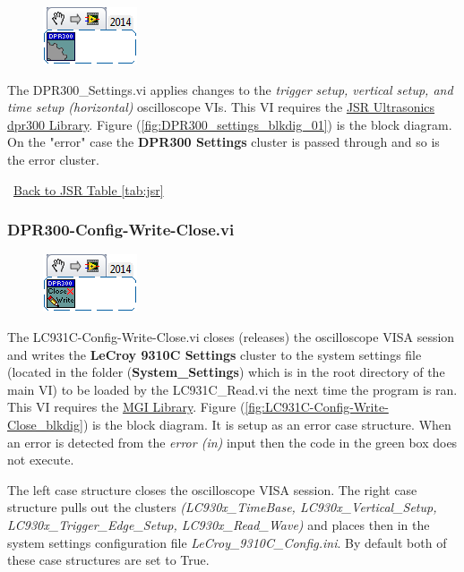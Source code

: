 \documentclass[11pt,a4paper,oldfontcommands]{memoir}
\begin{document}
\begin{figure}[h]
	\includegraphics[scale=0.625]{DPR300_settings_main_01}
	\label{fig:DPR300_settings_main_01}
\end{figure}

The DPR300\_Settings.vi applies changes to the \textit{trigger setup, vertical setup, and time setup (horizontal)} oscilloscope VIs. This VI requires the \href{http://sine.ni.com/apps/utf8/niid_web_display.model_page?p_model_id=5819}{JSR Ultrasonics dpr300 Library}. Figure (\ref{fig:DPR300_settings_blkdig_01}) is the block diagram. On the "error" case the \textbf{DPR300 Settings} cluster is passed through and so is the error cluster.

\noindent\hrulefill\, \hyperref[tab:jsr]{Back to JSR Table \ref{tab:jsr}}

\subsubsection{DPR300-Config-Write-Close.vi} \label{DPR300_cwc}
\noindent\hrulefill

\begin{figure}[h]
	\includegraphics[scale=0.625]{DPR300-Config-Write-Close_main_01}
	\label{fig:DPR300-Config-Write-Close_main_01}
\end{figure}

The LC931C-Config-Write-Close.vi closes (releases) the oscilloscope VISA session and writes the \textbf{LeCroy 9310C Settings} cluster to the system settings file (located in the folder (\textbf{System\_Settings}) which is in the root directory of the main VI) to be loaded by the LC931C\_Read.vi the next time the program is ran. This VI requires the \href{http://sine.ni.com/nips/cds/view/p/lang/en/nid/209753}{MGI Library}. Figure (\ref{fig:LC931C-Config-Write-Close_blkdig}) is the block diagram.  It is setup as an error case structure. When an error is detected from the \textit{error (in)} input then the code in the green box does not execute.

The left case structure closes the oscilloscope VISA session. The right case structure pulls out the clusters \textit{(LC930x\_TimeBase, LC930x\_Vertical\_Setup, LC930x\_Trigger\_Edge\_Setup, LC930x\_Read\_Wave)} and places then in the system settings configuration file \textit{LeCroy\_9310C\_Config.ini}. By default both of these case structures are set to True.
\end{document}
